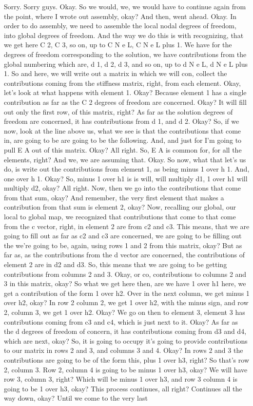 \documentclass[10pt]{article}
\begin{document}
Sorry. Sorry guys. Okay. So we would, we, we would have to continue again from the point, where I wrote out assembly, okay? And then, went ahead. Okay. In order to do assembly, we need to assemble the local nodal degrees of freedom, into global degrees of freedom. And the way we do this is with recognizing, that we get here C 2, C 3, so on, up to C N e L, C N e L plus 1. We have for the degrees of freedom corresponding to the solution, we have contributions from the global numbering which are, d 1, d 2, d 3, and so on, up to d N e L, d N e L plus 1. So and here, we will write out a matrix in which we will con, collect the contributions coming from the stiffness matrix, right, from each element. Okay, let's look at what happens with element 1. Okay? Because element 1 has a single contribution as far as the C 2 degrees of freedom are concerned. Okay? It will fill out only the first row, of this matrix, right? As far as the solution degrees of freedom are concerned, it has contributions from d 1, and d 2. Okay? So, if we now, look at the line above us, what we see is that the contributions that come in, are going to be are going to be the following. And, and just for I'm going to pull E A out of this matrix. Okay? All right. So, E A is common for, for all the elements, right? And we, we are assuming that. Okay. So now, what that let's us do, is write out the contributions from element 1, as being minus 1 over h 1. And, one over h 1. Okay? So, minus 1 over h1 is is will, will multiply d1, 1 over h1 will multiply d2, okay? All right. Now, then we go into the contributions that come from that sum, okay? And remember, the very first element that makes a contribution from that sum is element 2, okay? Now, recalling our global, our local to global map, we recognized that contributions that come to that come from the c vector, right, in element 2 are from c2 and c3. This means, that we are going to fill out as far as c2 and c3 are concerned, we are going to be filling out the we're going to be, again, using rows 1 and 2 from this matrix, okay? But as far as, as the contributions from the d vector are concerned, the contributions of element 2 are in d2 and d3. So, this means that we are going to be getting contributions from columns 2 and 3. Okay, or co, contributions to columns 2 and 3 in this matrix, okay? So what we get here then, are we have 1 over h1 here, we get a contribution of the form 1 over h2. Over in the next column, we get minus 1 over h2, okay? In row 2 column 2, we get 1 over h2, with the minus sign, and row 2, column 3, we get 1 over h2. Okay? We go on then to element 3, element 3 has contributions coming from c3 and c4, which is just next to it. Okay? As far as the d degrees of freedom of concern, it has contributions coming from d3 and d4, which are next, okay? So, it is going to occupy it's going to provide contributions to our matrix in rows 2 and 3, and columns 3 and 4. Okay? In rows 2 and 3 the contributions are going to be of the form this, plus 1 over h3, right? So that's row 2, column 3. Row 2, column 4 is going to be minus 1 over h3, okay? We will have row 3, column 3, right? Which will be minus 1 over h3, and row 3 column 4 is going to be 1 over h3, okay? This process continues, all right? Continues all the way down, okay? Until we come to the very last 
\end{document}
